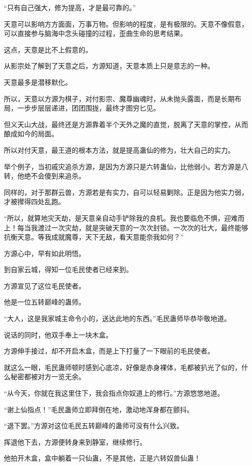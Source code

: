 \begin{this_body}
“只有自己强大，修为提高，才是最可靠的。”

天意可以影响方方面面，万事万物。但影响的程度，是有极限的。天意不像假意，可以直接参与脑海中念头碰撞的过程，歪曲生命的思考结果。

这点，天意是比不上假意的。

从影宗处了解到了天意之后，方源知道，天意本质上只是意志的一种。

天意最多是潜移默化。

所以，天意以方源为棋子，对付影宗、魔尊幽魂时，从未抛头露面，而是长期布局，一步步层层递进，团团围拢，最终才图穷匕见。

但义天山大战，最终还是方源靠着半个天外之魔的直觉，脱离了天意的掌控，从而酿成如今的局面。

所以对付天意，最王道的根本方法，就是提高蛊仙的修为，壮大自己的实力。

举个例子，当初戚灾追杀方源，是因为方源只是六转蛊仙，比他弱小。若方源是八转，他绝不会傻到来追杀。

同样的，对于那群云兽，方源若是有实力，自可以轻易剿除。正是因为他实力弱，才被撵得四处乱跑。

“所以，就算地灾天劫，是天意亲自动手铲除我的良机。我也要临危不惧，迎难而上！每当我渡过一次灾劫，就是突破天意的一次次封锁。一次次的壮大，最终能够抗衡天意。等我成就魔尊，天下无敌，看天意能奈我如何？”

方源心中，早有如此明悟。

到自家云城，得知一位毛民使者已经来到。

方源宣见了这位毛民使者。

他是一位五转巅峰的蛊师。

“大人，这是我家城主命令小的，送达此地的东西。”毛民蛊师毕恭毕敬地道。

说话的同时，他双手奉上一块木盒。

方源伸手接过，却不开启木盒，而是上下打量了一下眼前的毛民使者。

就这么一眼，毛民蛊师顿时感到心底凉，好像是赤身裸体，毛都被扒光了似的，什么秘密都被对方一览无余。

“从今天，你就在我这里住下，我会指点你奴道上的修行。”方源悠悠地道。

“谢上仙指点！”毛民蛊师立即拜倒在地，激动地浑身都在颤抖。

“退下罢。”方源对这位毛民五转巅峰的蛊师可没有什么兴致。

挥退他下去，方源便转身来到静室，继续修行。

他拍开木盒，盒中躺着一只仙蛊，不是其他，正是六转奴兽仙蛊！


\end{this_body}
